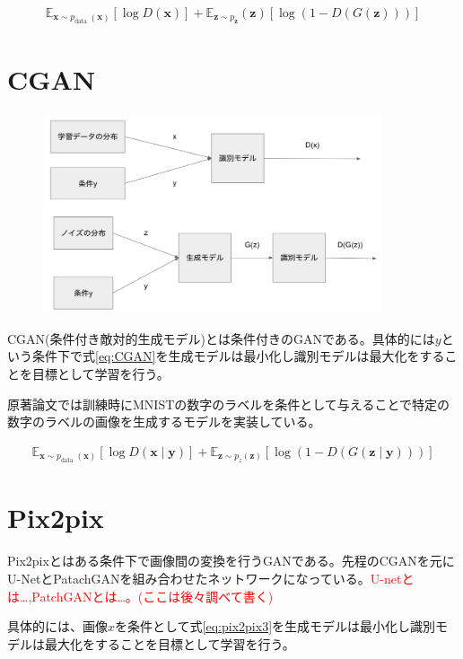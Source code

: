\begin{align}
\label{eq:GAN}
    \mathbb{E}_{\boldsymbol{x} \sim p_{\text {data }}(\boldsymbol{x})}[\log D(\boldsymbol{x})]+\mathbb{E}_{\boldsymbol{z} \sim p_{\boldsymbol{z}}}(\boldsymbol{z})[\log (1-D(G(\boldsymbol{z})))]
\end{align}

\section{CGAN}

\begin{figure}[H]
    \includegraphics[width=10.0cm]{figure/CGAN.png}
\end{figure}

CGAN(条件付き敵対的生成モデル)とは条件付きのGANである。具体的には$y$という条件下で式\ref{eq:CGAN}を生成モデルは最小化し識別モデルは最大化をすることを目標として学習を行う\cite{CGAN}。\par
原著論文では訓練時にMNISTの数字のラベルを条件として与えることで特定の数字のラベルの画像を生成するモデルを実装している。


\begin{align}
    \label{eq:CGAN}
    \mathbb{E}_{\boldsymbol{x} \sim p_{\text {data }}(\boldsymbol{x})}[\log D(\boldsymbol{x} \mid \boldsymbol{y})]+\mathbb{E}_{\boldsymbol{z} \sim p_{z}(\boldsymbol{z})}[\log (1-D(G(\boldsymbol{z} \mid \boldsymbol{y})))]
\end{align}


\section{Pix2pix}

Pix2pixとはある条件下で画像間の変換を行うGANである。先程のCGANを元にU-NetとPatachGANを組み合わせたネットワークになっている。\textcolor{red}{U-netとは…,PatchGANとは…。(ここは後々調べて書く)}\par
具体的には、画像$x$を条件として式\ref{eq:pix2pix3}を生成モデルは最小化し識別モデルは最大化をすることを目標として学習を行う\cite{pix2pix}。

